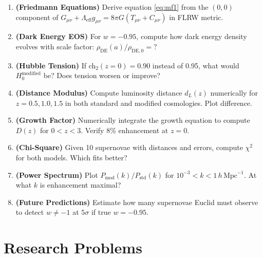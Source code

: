 \begin{enumerate}
\item \textbf{(Friedmann Equations)} Derive equation \eqref{eq:mf1} from the $(0,0)$ component of $G_{\mu\nu} + \Lambda_{\text{eff}} g_{\mu\nu} = 8\pi G (T_{\mu\nu} + C_{\mu\nu})$ in FLRW metric.

\item \textbf{(Dark Energy EOS)} For $w = -0.95$, compute how dark energy density evolves with scale factor: $\rho_{\text{DE}}(a) / \rho_{\text{DE},0} = ?$

\item \textbf{(Hubble Tension)} If ch$_2(z=0) = 0.90$ instead of 0.95, what would $H_0^{\text{modified}}$ be? Does tension worsen or improve?

\item \textbf{(Distance Modulus)} Compute luminosity distance $d_L(z)$ numerically for $z = 0.5, 1.0, 1.5$ in both standard and modified cosmologies. Plot difference.

\item \textbf{(Growth Factor)} Numerically integrate the growth equation to compute $D(z)$ for $0 < z < 3$. Verify 8\% enhancement at $z = 0$.

\item \textbf{(Chi-Square)} Given 10 supernovae with distances and errors, compute $\chi^2$ for both models. Which fits better?

\item \textbf{(Power Spectrum)} Plot $P_{\text{mod}}(k) / P_{\text{std}}(k)$ for $10^{-3} < k < 1 \, h \, \text{Mpc}^{-1}$. At what $k$ is enhancement maximal?

\item \textbf{(Future Predictions)} Estimate how many supernovae Euclid must observe to detect $w \neq -1$ at $5\sigma$ if true $w = -0.95$.
\end{enumerate}

\section*{Research Problems}

